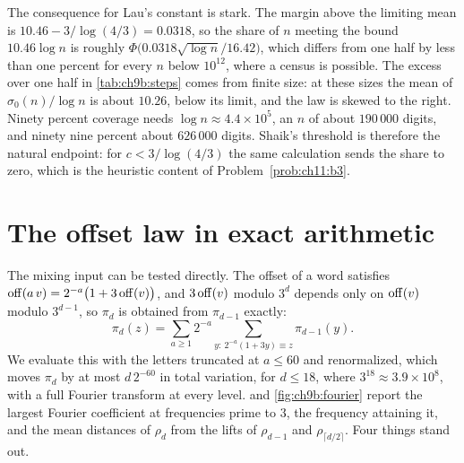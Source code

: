 The consequence for Lau's constant is stark. The margin above the limiting mean is $10.46-3/\log(4/3)=0.0318$, so the share of $n$ meeting the bound $10.46\log n$ is roughly $\Phi\bigl(0.0318\sqrt{\log n}/16.42\bigr)$, which differs from one half by less than one percent for every $n$ below $10^{12}$, where a census is possible. The excess over one half in \cref{tab:ch9b:steps} comes from finite size: at these sizes the mean of $\sigma_0(n)/\log n$ is about $10.26$, below its limit, and the law is skewed to the right. Ninety percent coverage needs $\log n\approx4.4\times10^5$, an $n$ of about $190\,000$ digits, and ninety nine percent about $626\,000$ digits. Shaik's threshold is therefore the natural endpoint: for $c<3/\log(4/3)$ the same calculation sends the share to zero, which is the heuristic content of Problem~\ref{prob:ch11:b3}.

\section{The offset law in exact arithmetic}\label{sec:ch9b:offsets}

The mixing input can be tested directly. The offset of a word satisfies $\operatorname{off}(a\,v)=2^{-a}\bigl(1+3\operatorname{off}(v)\bigr)$, and $3\operatorname{off}(v)$ modulo $3^d$ depends only on $\operatorname{off}(v)$ modulo $3^{d-1}$, so $\pi_d$ is obtained from $\pi_{d-1}$ exactly:
\[
  \pi_d(z)=\sum_{a\ge1}2^{-a}\sum_{y:\ 2^{-a}(1+3y)\equiv z}\pi_{d-1}(y) .
\]
We evaluate this with the letters truncated at $a\le60$ and renormalized, which moves $\pi_d$ by at most $d\,2^{-60}$ in total variation, for $d\le18$, where $3^{18}\approx3.9\times10^8$, with a full Fourier transform at every level.  and \cref{fig:ch9b:fourier} report the largest Fourier coefficient at frequencies prime to $3$, the frequency attaining it, and the mean distances of $\rho_d$ from the lifts of $\rho_{d-1}$ and $\rho_{\lceil d/2\rceil}$. Four things stand out.

